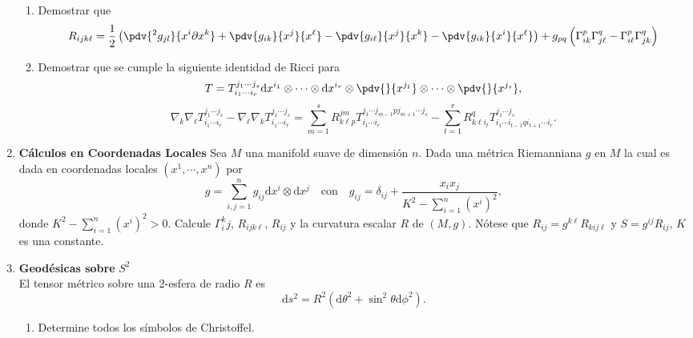 \documentclass[../main]{subfiles}
\begin{document}
\begin{adjustwidth}{0pt}{-100pt}
\begin{enumerate}
\begin{enumerate}[label=(\alph*)]
        \item Demostrar que 
        \begin{equation}
            R_{ijk\ell} = \dfrac{1}{2}\left(\pdv{^2 g_{jl}}{x^{i}\partial x^k}+\pdv{g_{ik}}{x^j}{x^{\ell}}-\pdv{g_{i\ell}}{x^j}{x^k}-\pdv{g_{ik}}{x^{i}}{x^{\ell}}\right)+g_{pq}\left(\Gamma^p_{ik}\Gamma^q_{j\ell}-\Gamma^p_{i\ell}\Gamma^q_{jk}\right)
        \end{equation}
        \item Demostrar que se cumple la siguiente identidad de Ricci para 
        \begin{equation}
            T=T^{j_1 \cdots j_s}_{i_1 \cdots i_r}\mathrm{d}x^{i_1}\otimes \cdots \otimes \mathrm{d}x^{i_r}\otimes \pdv{}{x^{j_1}}\otimes \cdots \otimes \pdv{}{x^{j_s}},
        \end{equation}
        \begin{equation}
            \nabla_k \nabla_{\ell} T^{j_1 \cdots j_s}_{i_1 \cdots i_r}-\nabla_{\ell}\nabla_k T^{j_1 \cdots j_s}_{i_1 \cdots i_r}=\sum_{m=1}^s R^{jm}_{k\ell p} T^{j_1 \cdots j_{m-1}p j_{m+1}\cdots j_s}_{i_1\cdots i_r}-\sum_{t=1}^r R^q_{k\ell i_t}T^{j_1 \cdots j_s}_{i_1 \cdots i_{t-1}q i_{t+1}\cdots i_r}.
        \end{equation}
    \end{enumerate}
    \item \textbf{Cálculos en Coordenadas Locales}
    Sea $M$ una manifold suave de dimensión $n$. Dada una métrica Riemanniana $g$ en $M$ la cual es dada en coordenadas locales $(x^1, \cdots, x^n)$ por 
    \begin{equation}
        g=\sum_{i, j=1}^n g_{ij} \mathrm{d}x^{i} \otimes \mathrm{d}x^{j}\quad \text{con} \quad g_{ij}=\delta_{ij}+\dfrac{x_i x_j}{K^2-\sum_{i=1}^n (x^{i})^2},
    \end{equation}
    donde $K^2-\sum_{i=1}^n (x^{i})^2>0$. Calcule $\Gamma^k_ij$, $R_{ijk\ell}$, $R_{ij}$ y la curvatura escalar $R$ de $(M, g)$. Nótese que $R_{ij}=g^{k\ell} R_{kij\ell}$ y $S=g^{ij}R_{ij}$, $K$ es una constante. 
    \item \textbf{Geodésicas sobre } $S^2$\\
    El tensor métrico sobre una 2-esfera de radio $R$ es 
    \begin{equation}
        \mathrm{d}s^2=R^2(\mathrm{d}\theta^2+\sin^2 \theta \mathrm{d}\phi^2).
    \end{equation}
    \begin{enumerate}[label=(\alph*)]
        \item Determine todos los símbolos de Christoffel.

\end{enumerate}
\end{enumerate}
\end{adjustwidth}
\end{document}
